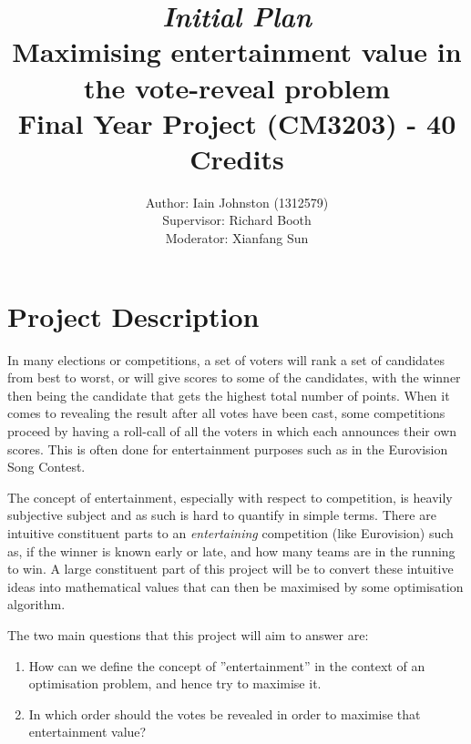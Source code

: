 \documentclass[12pt]{report}
\title{\textit{Initial Plan}\\\textbf{Maximising entertainment value in the vote-reveal problem}\\ Final Year Project (CM3203) - 40 Credits}
\author{Author: Iain Johnston (1312579) \\ Supervisor: Richard Booth\\ Moderator: Xianfang Sun}
\date{} %
\begin{document}
\maketitle

\tableofcontents %
\clearpage %


  
\section*{Project Description}
In many elections or competitions, a set of voters will rank a set of candidates from best to worst, or will give scores to some of the candidates, with the winner then being the candidate that gets the highest total number of points. When it comes to revealing the result after all votes have been cast, some competitions proceed by having a roll-call of all the voters in which each announces their own scores. This is often done for entertainment purposes such as in the Eurovision Song Contest.\cite{ref:EurovisionVoting}

The concept of entertainment, especially with respect to competition, is heavily subjective subject and as such is hard to quantify in simple terms. There are intuitive constituent parts to an \textit{entertaining} competition (like Eurovision) such as, if the winner is known early or late, and how many teams are in the running to win. A large constituent part of this project will be to convert these intuitive ideas into mathematical values that can then be maximised by some optimisation algorithm. 

The two main questions that this project will aim to answer are:

\begin{enumerate}
\item How can we define the concept of ''entertainment'' in the context of an optimisation problem, and hence try to maximise it.
\item  In which order should the votes be revealed in order to maximise that entertainment value?
\end{enumerate}
\end{document}
